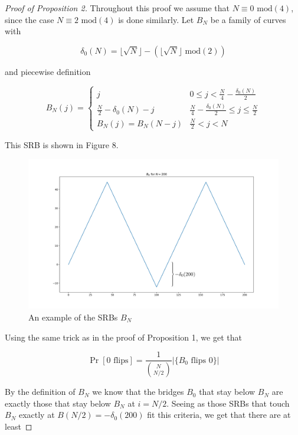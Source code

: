 \documentclass{article}
\theoremstyle{definition}
\begin{document}
\begin{proof}[Proof of Proposition 2] Throughout this proof we assume that $N\equiv0\,\,\mathrm{mod}(4)$, since the case $N\equiv 2\,\,\mathrm{mod}(4)$ is done similarly. Let $B_N$ be a family of curves with

$$\delta_0(N)=\lfloor \sqrt{N}\rfloor - (\lfloor \sqrt{N}\rfloor\,\,\mathrm{mod}(2))$$

and piecewise definition

\begin{equation*}
B_N(j)=
\begin{cases}
j & 0\leq j < \frac{N}{4}-\frac{\delta_0(N)}{2}\\
\frac{N}{2}-\delta_0(N)-j & \frac{N}{4}-\frac{\delta_0(N)}{2}\leq j \leq \frac{N}{2}\\
B_N(j)=B_N(N-j) & \frac{N}{2}<j<N
\end{cases}
\end{equation*}


This SRB is shown in Figure 8.

\begin{figure}[h!]
\caption{An example of the SRBs $B_N$}
\centering
\includegraphics[width=\textwidth]{Figure_8}
\end{figure}

Using the same trick as in the proof of Proposition 1, we get that

\begin{equation*}
\Pr[0\,\,\mathrm{flips}]=\frac{1}{{N \choose N/2}}|\{B_0 \,\, \mathrm{flips\,\, }0\}|
\end{equation*}

By the definition of $B_N$ we know that the bridges $B_0$ that stay below $B_N$ are exactly those that stay below $B_N$ at $i=N/2$. Seeing as those SRBs that touch $B_N$ exactly at $B(N/2)=-\delta_0(200)$ fit this criteria, we get that there are at least


\end{proof}
\end{document}
